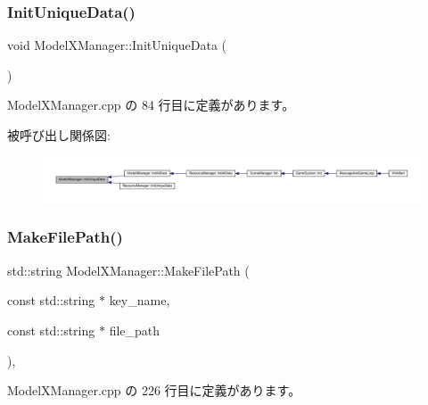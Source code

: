 \subsubsection{\texorpdfstring{Init\+Unique\+Data()}{InitUniqueData()}}
{\footnotesize\ttfamily void Model\+X\+Manager\+::\+Init\+Unique\+Data (\begin{DoxyParamCaption}{ }\end{DoxyParamCaption})\hspace{0.3cm}{\ttfamily [static]}}



 Model\+X\+Manager.\+cpp の 84 行目に定義があります。

被呼び出し関係図\+:
\nopagebreak
\begin{figure}[H]
\begin{center}
\leavevmode
\includegraphics[width=350pt]{class_model_x_manager_a9bed6cb5ffcd2cbfec6c405e21af362e_icgraph}
\end{center}
\end{figure}
\mbox{\label{class_model_x_manager_a2d367047714442f8a928e4360d11b773}} 
\subsubsection{\texorpdfstring{Make\+File\+Path()}{MakeFilePath()}}
{\footnotesize\ttfamily std\+::string Model\+X\+Manager\+::\+Make\+File\+Path (\begin{DoxyParamCaption}\item[{const std\+::string $\ast$}]{key\+\_\+name,  }\item[{const std\+::string $\ast$}]{file\+\_\+path }\end{DoxyParamCaption})\hspace{0.3cm}{\ttfamily [static]}, {\ttfamily [private]}}



 Model\+X\+Manager.\+cpp の 226 行目に定義があります。

